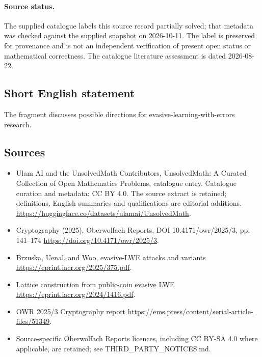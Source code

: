 \documentclass[11pt]{article}
\begin{document}
\paragraph{Source status.}
The supplied catalogue labels this source record partially solved; that metadata was checked against the supplied snapshot on 2026-10-11. The label is preserved for provenance and is not an independent verification of present open status or mathematical correctness. The catalogue literature assessment is dated 2026-08-22.
\subsection{Short English statement}
The fragment discusses possible directions for evasive-learning-with-errors research.
\subsection{Sources}
\begin{itemize}
\item[\hypertarget{source:statement:1}{S1}] Ulam AI and the UnsolvedMath Contributors, UnsolvedMath: A Curated Collection of Open Mathematics Problems, catalogue entry. Catalogue curation and metadata: CC BY 4.0. The source extract is retained; definitions, English summaries and qualifications are editorial additions.
\url{https://huggingface.co/datasets/ulamai/UnsolvedMath}.
\item[\hypertarget{source:statement:2}{S2}] Cryptography (2025), Oberwolfach Reports, DOI 10.4171/owr/2025/3, pp. 141--174
\url{https://doi.org/10.4171/owr/2025/3}.
\item[\hypertarget{source:statement:3}{S3}] Brzuska, Uenal, and Woo, evasive-LWE attacks and variants
\url{https://eprint.iacr.org/2025/375.pdf}.
\item[\hypertarget{source:statement:4}{S4}] Lattice construction from public-coin evasive LWE
\url{https://eprint.iacr.org/2024/1416.pdf}.
\item[\hypertarget{source:statement:5}{S5}] OWR 2025/3 Cryptography report
\url{https://ems.press/content/serial-article-files/51349}.
\item Source-specific Oberwolfach Reports licences, including CC BY-SA 4.0 where applicable, are retained; see THIRD\_PARTY\_NOTICES.md.
\end{itemize}
\end{document}
